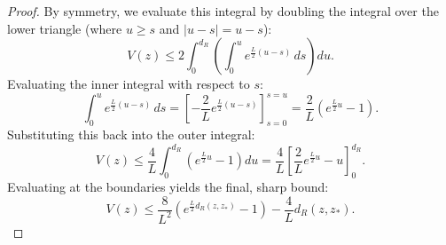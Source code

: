 \begin{proof}
By symmetry, we evaluate this integral by doubling the integral over the lower triangle (where $u \ge s$ and $|u-s| = u-s$):
\begin{equation}
    V(z) \le 2 \int_0^{d_R} \left( \int_0^u e^{\frac{L}{2}(u - s)} \, ds \right) du.
\end{equation}
Evaluating the inner integral with respect to $s$:
\begin{equation}
    \int_0^u e^{\frac{L}{2}(u - s)} \, ds = \left[ -\frac{2}{L} e^{\frac{L}{2}(u - s)} \right]_{s=0}^{s=u} = \frac{2}{L} \left( e^{\frac{L}{2}u} - 1 \right).
\end{equation}
Substituting this back into the outer integral:
\begin{equation}
    V(z) \le \frac{4}{L} \int_0^{d_R} \left( e^{\frac{L}{2}u} - 1 \right) du = \frac{4}{L} \left[ \frac{2}{L} e^{\frac{L}{2}u} - u \right]_0^{d_R}.
\end{equation}
Evaluating at the boundaries yields the final, sharp bound:
\begin{equation}
    V(z) \le \frac{8}{L^2} \left( e^{\frac{L}{2} d_R(z, z_*)} - 1 \right) - \frac{4}{L} d_R(z, z_*).
\end{equation}
\end{proof}


